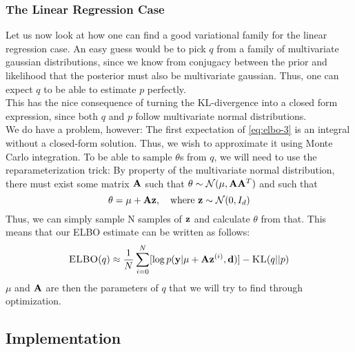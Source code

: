 \subsubsection{The Linear Regression Case}
Let us now look at how one can find a good variational family for the linear regression case.
An easy guess would be to pick $q$ from a family of multivariate gaussian distributions, since we know from conjugacy between the prior and likelihood that the posterior must also be multivariate gaussian.
Thus, one can expect $q$ to be able to estimate $p$ perfectly.\\
This has the nice consequence of turning the KL-divergence into a closed form expression, since both $q$ and $p$ follow multivariate normal distributions.\\
We do have a problem, however: The first expectation of \eqref{eq:elbo-3} is an integral without a closed-form solution.
Thus, we wish to approximate it using Monte Carlo integration. 
To be able to sample $\theta$s from $q$, we will need to use the reparameterization trick:
By property of the multivariate normal distribution, there must exist some matrix $\mathbf{A}$ such that $\theta \sim \mathcal{N}(\mu, \mathbf{A} \mathbf{A}^T)$ \cite{krause22}
and such that
\begin{equation}\theta = \mu + \B{A}\B{z}, \quad \textrm{where}\ \B{z}\sim \mathcal{N}(0,I_d)\end{equation}
Thus, we can simply sample N samples of $\mathbf{z}$ and calculate $\theta$ from that. 
This means that our ELBO estimate can be written as follows:
\begin{equation}\textsc{ELBO}(q) \approx \frac{1}{N}\sum_{i=0}^N [\log p(\mathbf{y} | \mu + \mathbf{A}\mathbf{z}^{(i)}, \mathbf{d})] - \textsc{KL}(q || p)\label{eq:final-elbo}\end{equation}
$\mu$ and $\mathbf{A}$ are then the parameters of $q$ that we will try to find through optimization.
\subsection{Implementation}
